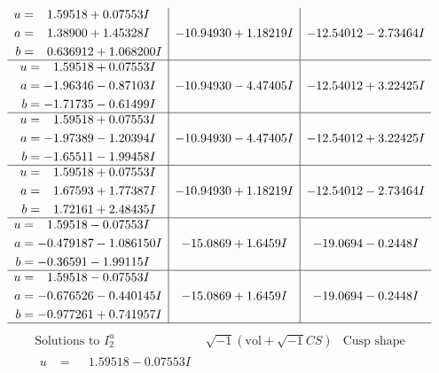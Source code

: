 \documentclass[1p]{elsarticle_modified}
\theoremstyle{definition}
\newcommand{\I}{\sqrt{-1}}
\begin{document}
$$\begin{array}{c|c|c}
\begin{aligned}
u &= \phantom{-}1.59518 + 0.07553 I \\
a &= \phantom{-}1.38900 + 1.45328 I \\
b &= \phantom{-}0.636912 + 1.068200 I\end{aligned}
 & -10.94930 + 1.18219 I & -12.54012 - 2.73464 I \\ \hline\begin{aligned}
u &= \phantom{-}1.59518 + 0.07553 I \\
a &= -1.96346 - 0.87103 I \\
b &= -1.71735 - 0.61499 I\end{aligned}
 & -10.94930 - 4.47405 I & -12.54012 + 3.22425 I \\ \hline\begin{aligned}
u &= \phantom{-}1.59518 + 0.07553 I \\
a &= -1.97389 - 1.20394 I \\
b &= -1.65511 - 1.99458 I\end{aligned}
 & -10.94930 - 4.47405 I & -12.54012 + 3.22425 I \\ \hline\begin{aligned}
u &= \phantom{-}1.59518 + 0.07553 I \\
a &= \phantom{-}1.67593 + 1.77387 I \\
b &= \phantom{-}1.72161 + 2.48435 I\end{aligned}
 & -10.94930 + 1.18219 I & -12.54012 - 2.73464 I \\ \hline\begin{aligned}
u &= \phantom{-}1.59518 - 0.07553 I \\
a &= -0.479187 - 1.086150 I \\
b &= -0.36591 - 1.99115 I\end{aligned}
 & -15.0869 + 1.6459 I & -19.0694 - 0.2448 I \\ \hline\begin{aligned}
u &= \phantom{-}1.59518 - 0.07553 I \\
a &= -0.676526 - 0.440145 I \\
b &= -0.977261 + 0.741957 I\end{aligned}
 & -15.0869 + 1.6459 I & -19.0694 - 0.2448 I\\
 \hline 
 \end{array}$$\newpage$$\begin{array}{c|c|c}  
\text{Solutions to }I^u_{2}& \I (\text{vol} + \sqrt{-1}CS) & \text{Cusp shape}\\
 \hline 
\begin{aligned}
u &= \phantom{-}1.59518 - 0.07553 I \\

\end{aligned}
\end{array}$$
\end{document}
